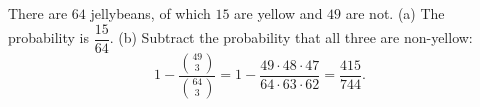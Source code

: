 There are $64$ jellybeans, of which $15$ are yellow and $49$ are not. (a) The probability is $\boxed{\dfrac{15}{64}}$. (b) Subtract the probability that all three are non-yellow:
\[1-\dfrac{\binom{49}{3}}{\binom{64}{3}}=1-\dfrac{49\cdot48\cdot47}{64\cdot63\cdot62}=\boxed{\dfrac{415}{744}}.\]
